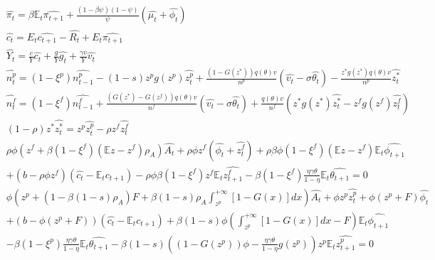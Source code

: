 \documentclass[a4paper]{article}
\begin{document}
\begin{align*}
    &\widehat{\pi_t} = \beta \mathbb{E}_t \widehat{\pi_{t+1}} + \frac{(1-\beta \psi) (1-\psi)}{\psi} \left( \widehat{\mu_t} + \widehat{\phi_t} \right)\\
    &\widehat{c_t} = E_t \widehat{c_{t+1}} - \widehat{R_t} + E_t \widehat{\pi_{t+1}}\\
    &\widehat{Y_t} = \frac{c}{Y} \widehat{c_t} + \frac{g}{Y} \widehat{g_t} + \frac{\gamma v}{Y} \widehat{v_t}\\
    &\widehat{n_t^p} = \left( 1 - \xi^p \right) \widehat{n_{t-1}^p} - (1-s) z^p g\left(z^p\right) \widehat{z_t^p} + \frac{\left(1 - G\left( z^*\right)\right) q(\theta) v}{n^p} \left( \widehat{v_t} - \sigma \widehat{\theta_t} \right) - \frac{z^* g\left( z^* \right) q(\theta) v}{n^p} \widehat{z_t^*}\\
    &\widehat{n_t^f} = \left( 1 - \xi^f \right) \widehat{n_{t-1}^f} + \frac{\left(G\left( z^*\right) - G\left( z^f\right)\right) q(\theta) v}{n^f} \left( \widehat{v_t} - \sigma \widehat{\theta_t} \right) + \frac{q(\theta) v}{n^f} \left( z^* g\left( z^* \right) \widehat{z_t^*} - z^f g\left( z^f \right) \widehat{z_t^f} \right)\\
    &(1-\rho) z^* \widehat{z_t^*} = z^p \widehat{z_t^p} - \rho z^f \widehat{z_t^f}\\
    &\rho \phi \left( z^f + \beta \left( 1 - \xi^f \right) \left( \mathbb{E}z - z^f \right) \rho_A \right) \widehat{A_t} + \rho \phi z^f \left( \widehat{\phi_t} + \widehat{z_t^f} \right) + \rho \beta \phi \left( 1 - \xi^f \right) \left( \mathbb{E}z - z^f \right)  \mathbb{E}_t \widehat{\phi_{t+1}}\\
    &+ \left( b - \rho \phi z^f \right) \left( \widehat{c_t} - \mathbb{E}_t c_{t+1} \right) - \rho \phi \beta \left( 1 - \xi^f \right) z^f \mathbb{E}_t \widehat{z_{t+1}^f} - \beta \left( 1 - \xi^f \right) \frac{\eta \gamma \theta}{1-\eta} \mathbb{E}_t \widehat{\theta_{t+1}} = 0\\
    &\phi \left( z^p + \left( 1-\beta (1-s)\rho_A \right) F + \beta (1-s) \rho_A \int_{z^p}^{+\infty} \left[ 1 - G(x) \right] dx \right) \widehat{A_t} + \phi z^p \widehat{z_t^p} + \phi \left( z^p + F \right) \widehat{\phi_t}\\
    &+ \left( b - \phi  \left( z^p + F \right) \right) \left( \widehat{c_t} - \mathbb{E}_t c_{t+1} \right) + \beta (1-s) \phi \left( \int_{z^p}^{+\infty} \left[ 1 - G(x) \right] dx - F \right) \mathbb{E}_t \widehat{\phi_{t+1}}\\
    &- \beta \left( 1 - \xi^p \right) \frac{\eta \gamma \theta}{1-\eta} \mathbb{E}_t \widehat{\theta_{t+1}} - \beta (1-s) \left( \left( 1 - G\left( z^p \right) \right) \phi - \frac{\eta \gamma \theta}{1-\eta} g \left( z^p \right) \right) z^p \mathbb{E}_t \widehat{z_{t+1}^p} = 0\\

\end{align*}
\end{document}
